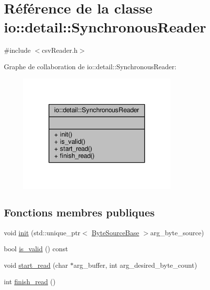 \hypertarget{classio_1_1detail_1_1SynchronousReader}{}\section{Référence de la classe io\+:\+:detail\+:\+:Synchronous\+Reader}
\label{classio_1_1detail_1_1SynchronousReader}


{\ttfamily \#include $<$csv\+Reader.\+h$>$}



Graphe de collaboration de io\+:\+:detail\+:\+:Synchronous\+Reader\+:
\nopagebreak
\begin{figure}[H]
\begin{center}
\leavevmode
\includegraphics[width=228pt]{classio_1_1detail_1_1SynchronousReader__coll__graph}
\end{center}
\end{figure}
\subsection*{Fonctions membres publiques}
\begin{DoxyCompactItemize}
\item 
void \hyperlink{classio_1_1detail_1_1SynchronousReader_a4dc78563ff667b92ad3096a94e834eb5}{init} (std\+::unique\+\_\+ptr$<$ \hyperlink{classio_1_1ByteSourceBase}{Byte\+Source\+Base} $>$arg\+\_\+byte\+\_\+source)
\item 
bool \hyperlink{classio_1_1detail_1_1SynchronousReader_a9d6b2c888cc7020df1bb81c8bb5c58bc}{is\+\_\+valid} () const
\item 
void \hyperlink{classio_1_1detail_1_1SynchronousReader_a6cad1371b97e14f660914898b16433c4}{start\+\_\+read} (char $\ast$arg\+\_\+buffer, int arg\+\_\+desired\+\_\+byte\+\_\+count)
\item 
int \hyperlink{classio_1_1detail_1_1SynchronousReader_a519a0cb25c641d2e51b6542749c44606}{finish\+\_\+read} ()
\end{DoxyCompactItemize}


